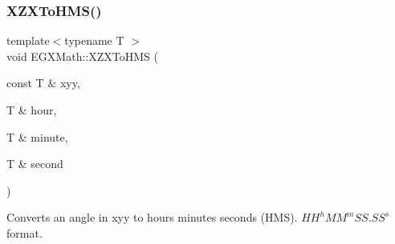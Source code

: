 \subsubsection{\texorpdfstring{X\+Z\+X\+To\+H\+M\+S()}{XZXToHMS()}}
{\footnotesize\ttfamily template$<$typename T $>$ \\
void E\+G\+X\+Math\+::\+X\+Z\+X\+To\+H\+MS (\begin{DoxyParamCaption}\item[{const T \&}]{xyy,  }\item[{T \&}]{hour,  }\item[{T \&}]{minute,  }\item[{T \&}]{second }\end{DoxyParamCaption})}



Converts an angle in xyy to hours minutes seconds (H\+MS). ${HH}^h{MM}^m{SS.SS}^s$ format. 


